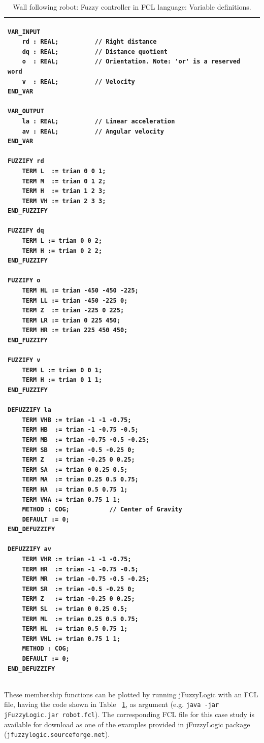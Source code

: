 \documentclass[conference]{IEEEtran}
\begin{document}
\begin{table}[!t]
\renewcommand{\arraystretch}{1.3}
\caption{Wall following robot: Fuzzy controller in FCL language: Variable definitions.}
\label{t:robotVars}
\centering
\begin{tabular}{|l|}
\hline
\begin{lstlisting}
VAR_INPUT
	rd : REAL;			// Right distance
	dq : REAL;			// Distance quotient
	o  : REAL;			// Orientation. Note: 'or' is a reserved word
	v  : REAL;			// Velocity
END_VAR

VAR_OUTPUT
	la : REAL;			// Linear acceleration
	av : REAL;			// Angular velocity
END_VAR

FUZZIFY rd
	TERM L  := trian 0 0 1;
	TERM M  := trian 0 1 2;
	TERM H  := trian 1 2 3;
	TERM VH := trian 2 3 3;
END_FUZZIFY

FUZZIFY dq
	TERM L := trian 0 0 2;
	TERM H := trian 0 2 2;
END_FUZZIFY

FUZZIFY o
	TERM HL := trian -450 -450 -225;
	TERM LL := trian -450 -225 0;
	TERM Z  := trian -225 0 225;
	TERM LR := trian 0 225 450;
	TERM HR := trian 225 450 450;
END_FUZZIFY

FUZZIFY v
	TERM L := trian 0 0 1;
	TERM H := trian 0 1 1;
END_FUZZIFY

DEFUZZIFY la
	TERM VHB := trian -1 -1 -0.75;
	TERM HB  := trian -1 -0.75 -0.5;
	TERM MB  := trian -0.75 -0.5 -0.25;
	TERM SB  := trian -0.5 -0.25 0;
	TERM Z   := trian -0.25 0 0.25;
	TERM SA  := trian 0 0.25 0.5;
	TERM MA  := trian 0.25 0.5 0.75;
	TERM HA  := trian 0.5 0.75 1;
	TERM VHA := trian 0.75 1 1;
	METHOD : COG;			// Center of Gravity
	DEFAULT := 0;
END_DEFUZZIFY

DEFUZZIFY av
	TERM VHR := trian -1 -1 -0.75;
	TERM HR  := trian -1 -0.75 -0.5;
	TERM MR  := trian -0.75 -0.5 -0.25;
	TERM SR  := trian -0.5 -0.25 0;
	TERM Z   := trian -0.25 0 0.25;
	TERM SL  := trian 0 0.25 0.5;
	TERM ML  := trian 0.25 0.5 0.75;
	TERM HL  := trian 0.5 0.75 1;
	TERM VHL := trian 0.75 1 1;
	METHOD : COG;
	DEFAULT := 0;
END_DEFUZZIFY

\end{lstlisting} \\
\hline
\end{tabular}
\end{table}

These membership functions can be plotted by running jFuzzyLogic with an FCL file, having the code shown in Table~ \ref{t:robotVars},  as argument (e.g. \texttt{java -jar jFuzzyLogic.jar robot.fcl}). 
The corresponding FCL file for this case study is available for download as one of the examples provided in jFuzzyLogic package (\texttt{jfuzzylogic.sourceforge.net}).
\end{document}
